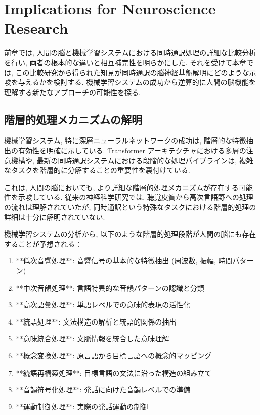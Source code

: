 \section{Implications for Neuroscience Research}

前章では, 人間の脳と機械学習システムにおける同時通訳処理の詳細な比較分析を行い, 両者の根本的な違いと相互補完性を明らかにした.
それを受けて本章では, この比較研究から得られた知見が同時通訳の脳神経基盤解明にどのような示唆を与えるかを検討する.
機械学習システムの成功から逆算的に人間の脳機能を理解する新たなアプローチの可能性を探る.

\subsection{階層的処理メカニズムの解明}

機械学習システム, 特に深層ニューラルネットワークの成功は, 階層的な特徴抽出の有効性を明確に示している.
Transformer アーキテクチャにおける多層の注意機構や, 最新の同時通訳システムにおける段階的な処理パイプラインは, 複雑なタスクを階層的に分解することの重要性を裏付けている.

これは, 人間の脳においても, より詳細な階層的処理メカニズムが存在する可能性を示唆している.
従来の神経科学研究では, 聴覚皮質から高次言語野への処理の流れは理解されていたが, 同時通訳という特殊なタスクにおける階層的処理の詳細は十分に解明されていない.

機械学習システムの分析から, 以下のような階層的処理段階が人間の脳にも存在することが予想される：

\begin{enumerate}
\item **低次音響処理**: 音響信号の基本的な特徴抽出 (周波数, 振幅, 時間パターン)
\item **中次音韻処理**: 言語特異的な音韻パターンの認識と分類
\item **高次語彙処理**: 単語レベルでの意味的表現の活性化
\item **統語処理**: 文法構造の解析と統語的関係の抽出
\item **意味統合処理**: 文脈情報を統合した意味理解
\item **概念変換処理**: 原言語から目標言語への概念的マッピング
\item **統語再構築処理**: 目標言語の文法に沿った構造の組み立て
\item **音韻符号化処理**: 発話に向けた音韻レベルでの準備
\item **運動制御処理**: 実際の発話運動の制御
\end{enumerate}


